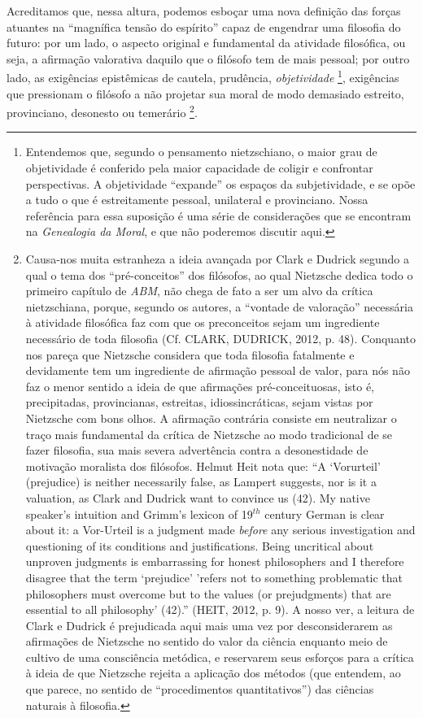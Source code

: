 \documentclass[
	12pt,				%
	openright,			%
	oneside,			%
	a4paper,			%
	english,			%
	french,				%
	spanish,			%
	brazil				%
	]{abntex2}
\begin{document}
	Acreditamos que, nessa altura, podemos esboçar uma nova definição das forças atuantes na “magnífica tensão do espírito” capaz de engendrar uma filosofia do futuro: por um lado, o aspecto original e fundamental da atividade filosófica, ou seja, a afirmação valorativa daquilo que o filósofo tem de mais pessoal; por outro lado, as exigências epistêmicas de cautela, prudência, \textit{objetividade}
\footnote{Entendemos que, segundo o pensamento nietzschiano, o maior grau de objetividade é conferido pela maior capacidade de coligir e confrontar perspectivas. A objetividade “expande” os espaços da subjetividade, e se opõe a tudo o que é estreitamente pessoal, unilateral e provinciano. Nossa referência para essa suposição é uma série de considerações que se encontram na \textit{Genealogia da Moral}, e que não poderemos discutir aqui.}, 
exigências que pressionam o filósofo a não projetar sua moral de modo demasiado estreito, provinciano, desonesto ou temerário
\footnote{Causa-nos muita estranheza a ideia avançada por Clark e Dudrick segundo a qual o tema dos “pré-conceitos” dos filósofos, ao qual Nietzsche dedica todo o primeiro capítulo de \textit{ABM}, não chega de fato a ser um alvo da crítica nietzschiana, porque, segundo os autores, a “vontade de valoração” necessária à atividade filosófica faz com que os preconceitos sejam um ingrediente necessário de toda filosofia (Cf. CLARK, DUDRICK, 2012, p. 48). Conquanto nos pareça que Nietzsche considera que toda filosofia fatalmente e devidamente tem um ingrediente de afirmação pessoal de valor, para nós não faz o menor sentido a ideia de que afirmações pré-conceituosas, isto é, precipitadas, provincianas, estreitas, idiossincráticas, sejam vistas por Nietzsche com bons olhos. A afirmação contrária consiste em neutralizar o traço mais fundamental da crítica de Nietzsche ao modo tradicional de se fazer filosofia, sua mais severa advertência contra a desonestidade de motivação moralista dos filósofos. Helmut Heit nota que: “A ‘Vorurteil’ (prejudice) is neither necessarily false, as Lampert suggests, nor is it a valuation, as Clark and Dudrick want to convince us (42). My native speaker’s intuition and Grimm’s lexicon of 19$^{th}$ century German is clear about it: a Vor-Urteil is a judgment made \textit{before} any serious investigation and questioning of its conditions and justifications. Being uncritical about unproven judgments is embarrassing for honest philosophers and I therefore disagree that the term ‘prejudice’ 'refers not to something problematic that philosophers must overcome but to the values (or prejudgments) that are essential to all philosophy' (42).” (HEIT, 2012, p. 9). A nosso ver, a leitura de Clark e Dudrick é prejudicada aqui mais uma vez por desconsiderarem as afirmações de Nietzsche no sentido do valor da ciência enquanto meio de cultivo de uma consciência metódica, e reservarem seus esforços para a crítica à ideia de que Nietzsche rejeita a aplicação dos métodos (que entendem, ao que parece, no sentido de “procedimentos quantitativos”) das ciências naturais à filosofia.}. 
\end{document}

